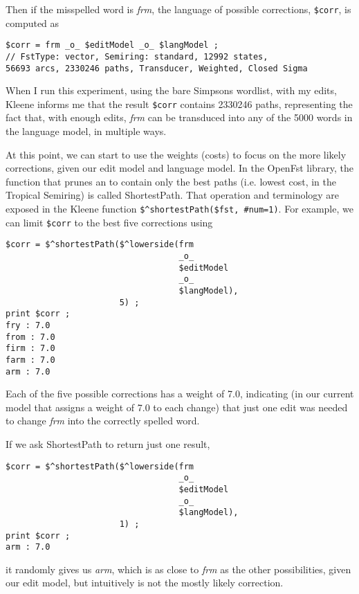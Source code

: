 \noindent
Then if the misspelled word is \emph{frm}, the language of possible corrections,
\verb!$corr!, is computed as

\begin{Verbatim}
$corr = frm _o_ $editModel _o_ $langModel ;
// FstType: vector, Semiring: standard, 12992 states,
56693 arcs, 2330246 paths, Transducer, Weighted, Closed Sigma
\end{Verbatim}

\noindent
When I run this experiment, using the bare Simpsons wordlist, with my edits, Kleene
informs me that the result \texttt{\$corr} contains 2330246 paths, representing
the fact that, with enough edits, \emph{frm} can be transduced into any of the
5000 words in the language model, in multiple ways.

At this point, we can start to use the weights (costs) to focus on the more
likely corrections, given our edit model and language model.  In the OpenFst
library, the function that prunes an \fsm{} to contain only the best paths (i.e.\@
lowest cost, in the Tropical Semiring) is called ShortestPath.  That operation
and terminology are exposed in the Kleene function \verb!$^shortestPath($fst, #num=1)!.  For
example, we can limit \verb!$corr! to the best five corrections using

\begin{Verbatim}
$corr = $^shortestPath($^lowerside(frm 
                                   _o_ 
                                   $editModel 
                                   _o_ 
                                   $langModel), 
                       5) ;
print $corr ;
fry : 7.0
from : 7.0
firm : 7.0
farm : 7.0
arm : 7.0
\end{Verbatim}

\noindent
Each of the five possible corrections has a weight of 7.0, indicating (in our
current model that assigns a weight of 7.0 to each change) that just one 
edit was needed to change \emph{frm} into the correctly
spelled word.  

If we ask ShortestPath to return just one result,

\begin{Verbatim}
$corr = $^shortestPath($^lowerside(frm 
                                   _o_ 
                                   $editModel 
                                   _o_ 
                                   $langModel), 
                       1) ;
print $corr ;
arm : 7.0
\end{Verbatim}

\noindent
it randomly gives us \emph{arm}, which is as close to \emph{frm} as the
other possibilities, given our edit model,
but intuitively is not the mostly likely correction.  

